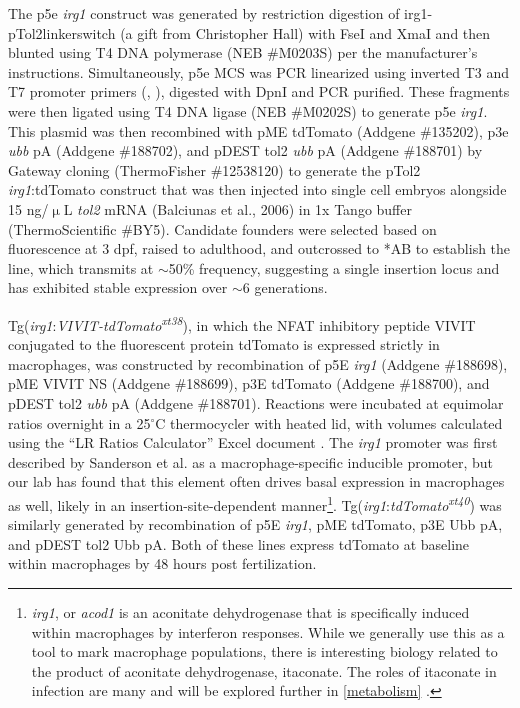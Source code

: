 The p5e \textit{irg1} construct was generated by restriction digestion of irg1\hyp{}pTol2linkerswitch \citep{Sanderson2015} (a gift from Christopher Hall) with FseI and XmaI and then blunted using T4 DNA polymerase (NEB \#M0203S) per the manufacturer's instructions. Simultaneously, p5e MCS \citep{Kwan2007} was PCR linearized using inverted T3 and T7 promoter primers (, ), digested with DpnI and PCR purified. These fragments were then ligated using T4 DNA ligase (NEB \#M0202S) to generate p5e \textit{irg1}. This plasmid was then recombined with pME tdTomato (Addgene \#135202), p3e \textit{ubb} pA (Addgene \#188702), and pDEST tol2 \textit{ubb} pA (Addgene \#188701) by Gateway cloning (ThermoFisher \#12538120) to generate the pTol2 \textit{irg1}:tdTomato construct that was then injected into single cell embryos alongside 15 ng/$\upmu$L \textit{tol2} mRNA (Balciunas et al., 2006) in 1x Tango buffer (ThermoScientific \#BY5). Candidate founders were selected based on fluorescence at 3 dpf, raised to adulthood, and outcrossed to *AB to establish the line, which transmits at $\sim$50\% frequency, suggesting a single insertion locus and has exhibited stable expression over ${\sim}$6 generations.

Tg(\textit{irg1}:\textit{VIVIT\hyp{}tdTomato\textsuperscript{xt38}}), in which the NFAT inhibitory peptide VIVIT conjugated to the fluorescent protein tdTomato is expressed strictly in macrophages, was constructed by recombination of p5E \textit{irg1} (Addgene \#188698), pME VIVIT NS (Addgene \#188699), p3E tdTomato (Addgene \#188700), and pDEST tol2 \textit{ubb} pA (Addgene \#188701). Reactions were incubated at equimolar ratios overnight in a 25$^{\circ}$C thermocycler with heated lid, with volumes calculated using the ``LR Ratios Calculator'' Excel document \citep{NFATZenodo}. The \textit{irg1} promoter was first described by Sanderson et al. as a macrophage\hyp{}specific inducible promoter, but our lab has found that this element often drives basal expression in macrophages as well, likely in an insertion\hyp{}site\hyp{}dependent manner\footnote{\textit{irg1}, or \textit{acod1} is an aconitate dehydrogenase that is specifically induced within macrophages by interferon responses. While we generally use this as a tool to mark macrophage populations, there is interesting biology related to the product of aconitate dehydrogenase, itaconate. The roles of itaconate in infection are many and will be explored further in \autoref{metabolism} \citep{Coelho2022, Peace2022, Lin2021, ONeill2019, Chen2022, Nair2018, Wu2020}.}. Tg(\textit{irg1}:\textit{tdTomato\textsuperscript{xt40}}) was similarly generated by recombination of p5E \textit{irg1}, pME tdTomato, p3E Ubb pA, and pDEST tol2 Ubb pA. Both of these lines express tdTomato at baseline within macrophages by 48 hours post fertilization.

